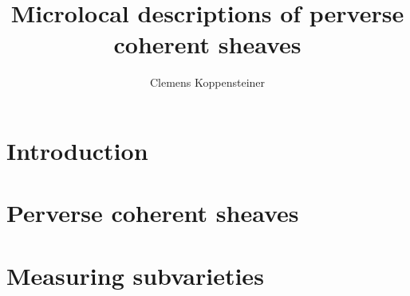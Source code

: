 \documentclass[english]{long-notes}
\title{Microlocal descriptions of perverse coherent sheaves}
\author{Clemens Koppensteiner}
\begin{document}
\maketitle
\tableofcontents

\chapter{Introduction}
\chapter{Perverse coherent sheaves}
\chapter{Measuring subvarieties}

\printbibliography
\end{document}
